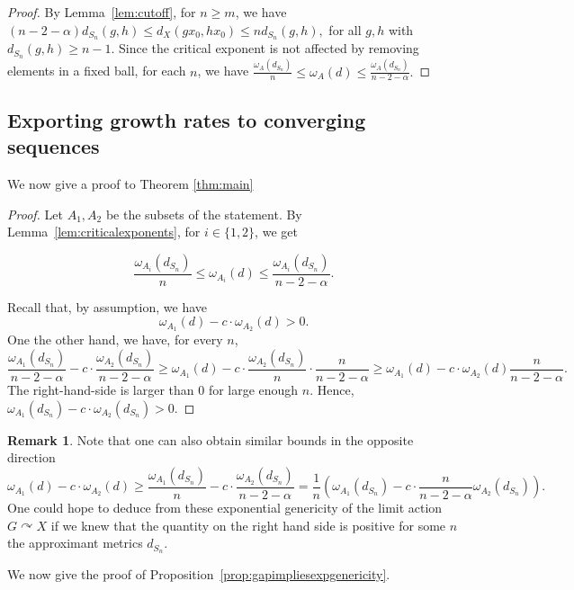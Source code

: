 \documentclass{amsart}
\numberwithin{thm}{section}
\numberwithin{figure}{section}
\theoremstyle{definition}
\newtheorem{remark}[thm]{Remark}
\theoremstyle{definition}
\theoremstyle{remark}
\numberwithin{equation}{section}
\theoremstyle{plain}
\begin{document}
\begin{proof} By Lemma~\ref{lem:cutoff}, for $n \geq m$, we have $(n-2-\alpha)d_{S_n}(g,h) \leq d_X(gx_0,hx_0) \leq n d_{S_n}(g,h),$ for all $g,h$ with $d_{S_n}(g,h) \geq n-1$. Since the critical exponent is not affected by removing elements in a fixed ball, for each $n$, we have $\frac{\omega_A(d_{S_n})}{n} \leq \omega_A (d) \leq \frac{\omega_A(d_{S_n})}{n-2-\alpha}.$
\end{proof}


\subsection{Exporting growth rates to converging sequences} We now give a proof to Theorem \ref{thm:main}



\begin{proof} Let $A_1,A_2$ be the subsets of the statement. By Lemma~\ref{lem:criticalexponents}, for $i \in \{1,2\}$, we get

\[
\frac{\omega_{A_i}(d_{S_n})}{n} \leq \omega_{A_i}(d) \leq \frac{\omega_{A_i}(d_{S_n})}{n-2-\alpha}.
\]

Recall that, by assumption, we have
\[
\omega_{A_1}(d)-c \cdot \omega_{A_2}(d) >0.
\]
One the other hand, we have, for every $n$,
\[
\frac{\omega_{A_1}(d_{S_n})}{n-2-\alpha}-c \cdot\frac{\omega_{A_2}(d_{S_n})}{n-2-\alpha} \geq \omega_{A_1}(d) - c \cdot\frac{\omega_{A_2}(d_{S_n})}{n} \cdot \frac{n}{n-2-\alpha} \geq \omega_{A_1}(d) - c \cdot\omega_{A_2}(d) \frac{n}{n-2-\alpha}.
\]
The right-hand-side is larger than $0$ for large enough $n$.
Hence, $\omega_{A_1}(d_{S_n})-c \cdot\omega_{A_2}(d_{S_n})>0$.
\end{proof}

\begin{remark}
Note that one can also obtain similar bounds in the opposite direction
\[
\omega_{A_1}(d)-c \cdot\omega_{A_2}(d) \geq \frac{\omega_{A_1}(d_{S_n})}{n} - c \cdot\frac{\omega_{A_2}(d_{S_n})}{n-2-\alpha} = \frac{1}{n} \left(\omega_{A_1}(d_{S_n}) - c \cdot\frac{n}{n-2-\alpha}\omega_{A_2}(d_{S_n})\right).
\]
One could hope to deduce from these exponential genericity of the limit action $G \curvearrowright X$ if we knew that the quantity on the right hand side is positive for some $n$ the approximant metrics $d_{S_n}$.
\label{rmk:oppositebound}
\end{remark}
 We now give the proof of Proposition~\ref{prop:gapimpliesexpgenericity}.
 
\end{document}
